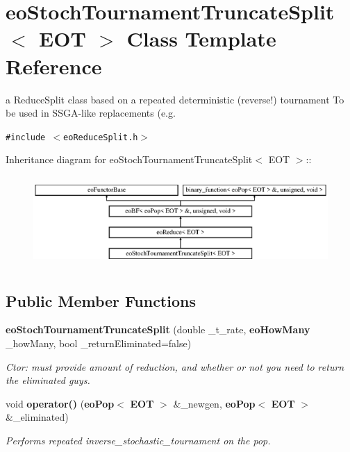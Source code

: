 \section{eo\-Stoch\-Tournament\-Truncate\-Split$<$ EOT $>$ Class Template Reference}
\label{classeo_stoch_tournament_truncate_split}
a Reduce\-Split class based on a repeated deterministic (reverse!) tournament To be used in SSGA-like replacements (e.g.  


{\tt \#include $<$eo\-Reduce\-Split.h$>$}

Inheritance diagram for eo\-Stoch\-Tournament\-Truncate\-Split$<$ EOT $>$::\begin{figure}[H]
\begin{center}
\leavevmode
\includegraphics[height=3.45679cm]{classeo_stoch_tournament_truncate_split}
\end{center}
\end{figure}
\subsection*{Public Member Functions}
\begin{CompactItemize}
\item 
{\bf eo\-Stoch\-Tournament\-Truncate\-Split} (double \_\-t\_\-rate, {\bf eo\-How\-Many} \_\-how\-Many, bool \_\-return\-Eliminated=false)\label{classeo_stoch_tournament_truncate_split_a0}

\begin{CompactList}\small\item\em Ctor: must provide amount of reduction, and whether or not you need to return the eliminated guys. \item\end{CompactList}\item 
void {\bf operator()} ({\bf eo\-Pop}$<$ {\bf EOT} $>$ \&\_\-newgen, {\bf eo\-Pop}$<$ {\bf EOT} $>$ \&\_\-eliminated)\label{classeo_stoch_tournament_truncate_split_a1}

\begin{CompactList}\small\item\em Performs repeated inverse\_\-stochastic\_\-tournament on the pop. \item\end{CompactList}\end{CompactItemize}
